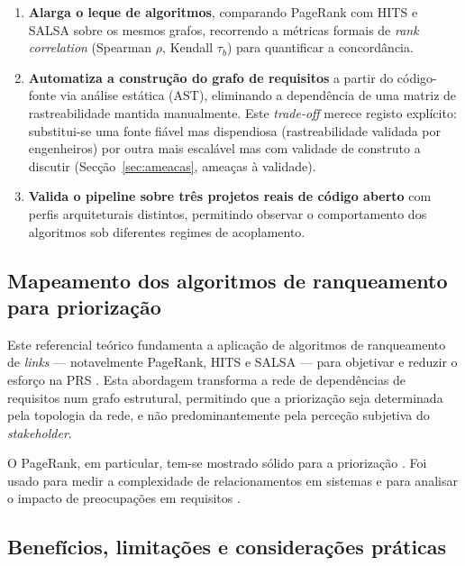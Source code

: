 \begin{enumerate}
    \item \textbf{Alarga o leque de algoritmos}, comparando PageRank
        com HITS \parencite{kleinberg1999} e SALSA
        \parencite{lempel2001} sobre os mesmos grafos, recorrendo a
        métricas formais de \emph{rank correlation} (Spearman $\rho$,
        Kendall $\tau_b$) para quantificar a concordância.
    \item \textbf{Automatiza a construção do grafo de requisitos} a
        partir do código-fonte via análise estática (AST), eliminando
        a dependência de uma matriz de rastreabilidade mantida
        manualmente. Este \emph{trade-off} merece registo explícito:
        substitui-se uma fonte fiável mas dispendiosa (rastreabilidade
        validada por engenheiros) por outra mais escalável mas com
        validade de construto a discutir
        (Secção~\ref{sec:ameacas}, ameaças à validade).
    \item \textbf{Valida o pipeline sobre três projetos reais de
        código aberto} com perfis arquiteturais distintos, permitindo
        observar o comportamento dos algoritmos sob diferentes
        regimes de acoplamento.
\end{enumerate}

\subsection{Mapeamento dos algoritmos de ranqueamento para
priorização}
\label{sec:mapeamento}

Este referencial teórico fundamenta a aplicação de algoritmos de
ranqueamento de \emph{links} --- notavelmente PageRank, HITS e
SALSA --- para objetivar e reduzir o esforço na PRS
\parencite{silva2018, ding2002}. Esta abordagem transforma a rede de
dependências de requisitos num grafo estrutural, permitindo que a
priorização seja determinada pela topologia da rede, e não
predominantemente pela perceção subjetiva do \emph{stakeholder}.

O PageRank, em particular, tem-se mostrado sólido para a priorização
\parencite{silva2018}. Foi usado para medir a complexidade de
relacionamentos em sistemas \parencite{li2009} e para analisar o
impacto de preocupações em requisitos \parencite{jin2009}.

\subsection{Benefícios, limitações e considerações práticas}
\label{sec:beneficios}

